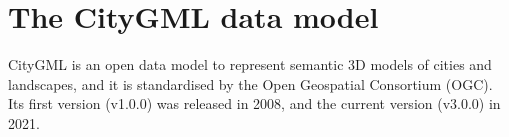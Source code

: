 

%
\section[CityGML data model]{The CityGML data model}%

CityGML is an open data model to represent semantic 3D models of cities and landscapes, and it is standardised by the Open Geospatial Consortium (OGC). 
Its first version (v1.0.0) was released in 2008, and the current version (v3.0.0) in 2021.

